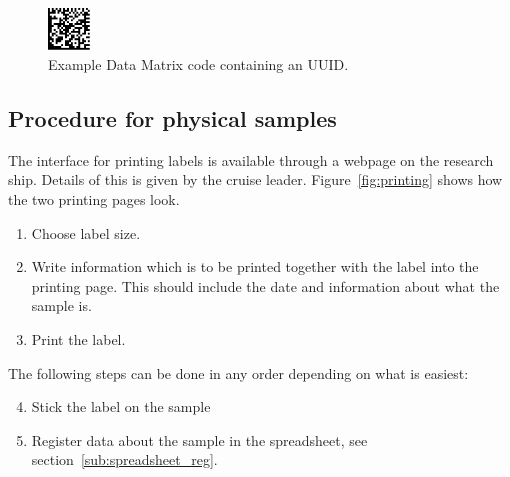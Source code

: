 \documentclass[a4paper,english, 11pt]{article}
\begin{document}
\begin{figure}[htb]
    \centering
    \includegraphics[width=0.1\textwidth]{Data_matrix.png}
    \caption{\label{fig:data_matrix}
        Example Data Matrix code containing an UUID.
    }

\end{figure}

\subsection{Procedure for physical samples} %
\label{sub:Procedure for physical samples}


The interface for printing labels is available through a webpage on the research ship. Details of this is given by the cruise leader. Figure~\ref{fig:printing} shows how the two printing pages look.

\begin{enumerate}
    \item Choose label size.
    \item Write information which is to be printed together with the label into the printing page. This should include the date and information about what the sample is.
    \item Print the label.  
\end{enumerate}
The following steps can be done in any order depending on what is easiest:
\begin{enumerate}
\setcounter{enumi}{3}
    \item Stick the label on the sample
    \item Register data about the sample in the spreadsheet, see section~\ref{sub:spreadsheet_reg}.
\end{enumerate}
\end{document}

